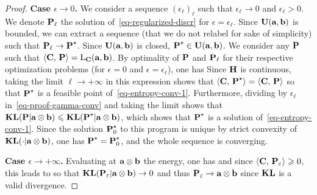 \begin{proof}
	\textbf{Case $\epsilon \rightarrow 0$.}
	 We consider a sequence $(\epsilon_\ell)_\ell$ such that $\epsilon_\ell \rightarrow 0$ and $\epsilon_\ell > 0$.	
 	We denote $\P_\ell$ the solution of~\eqref{eq-regularized-discr} for $\epsilon=\epsilon_\ell$. 
	Since $\CouplingsD(\a,\b)$ is bounded, we can extract a sequence (that we do not relabel for sake of simplicity) such that $\P_\ell \rightarrow \P^\star$. Since $\CouplingsD(\a,\b)$ is closed, $\P^\star \in \CouplingsD(\a,\b)$. We consider any $\P$ such that $\dotp{\C}{\P} = \MKD_\C(\a,\b)$. By optimality of $\P$ and $\P_\ell$ for their respective optimization problems (for $\epsilon=0$ and $\epsilon=\epsilon_\ell$), one has
 	Since $\HD$ is continuous, taking the limit $\ell \rightarrow +\infty$ in this expression shows that 
 	$\dotp{\C}{\P^\star} = \dotp{\C}{\P}$ so that $\P^\star$ is a feasible point of~\eqref{eq-entropy-conv-1}. Furthermore, dividing by $\epsilon_\ell$ in~\eqref{eq-proof-gamma-conv} and taking the limit shows that 
 	$\KLD(\P|\a \otimes \b) \leq \KLD(\P^\star|\a \otimes \b)$, which shows that $\P^\star$ is a solution of~\eqref{eq-entropy-conv-1}. Since the solution $\P_0^\star$ to this program is unique by strict convexity of $\KLD(\cdot|\a \otimes \b)$, one has $\P^\star = \P_0^\star$, and the whole sequence is converging. 
	
	
	\textbf{Case $\epsilon \rightarrow +\infty$.} Evaluating at $\a \otimes \b$ the energy, one has
	and since $\dotp{\C}{\P_\epsilon} \geq 0$, this leads to
	so that $\KLD(\P_\epsilon|\a \otimes \b) \rightarrow 0$ and thus $\P_\epsilon \rightarrow \a \otimes \b$ since $\KLD$ is a valid divergence.
\end{proof}






